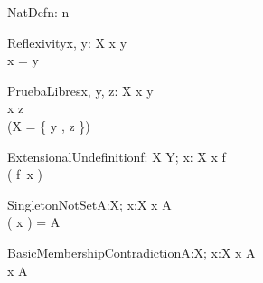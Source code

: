 \begin{theorem}{NatDef}{n: \nat}
 \leq n
\end{theorem}


\begin{theorem}{Reflexivity}{x, \const y: X}
x \neq y \\
x = y
\end{theorem}

\begin{theorem}{PruebaLibres}{x, \const y, \const z: X}
x \neq y \\
x \neq z \\
\eval(X = \{ y , z \})
\end{theorem}


\begin{theorem}{ExtensionalUndefinition}{f: X \pfun Y; x: X}
x \notin \dom f \\
\sw( f~x ) \\
\end{theorem}






\begin{theorem}{SingletonNotSet}{A:\power X; x:X}
x \notin A \\
\se( x ) = A
\end{theorem}

\begin{theorem}{BasicMembershipContradiction}{A:\power X; x:X}
x \in A \\
x \notin A
\end{theorem}

